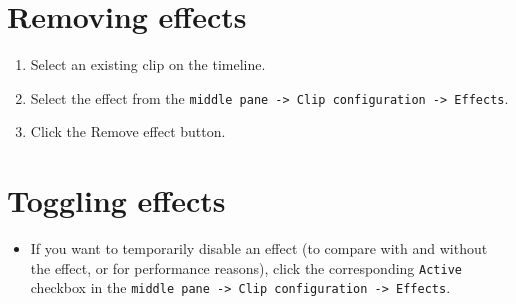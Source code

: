 
\section{Removing effects}

\begin{enumerate}
\item Select an existing clip on the timeline.
\item Select the effect from the
  \verb|middle pane -> Clip configuration -> Effects|.
\item Click the Remove effect button.
\end{enumerate}


\section{Toggling effects}

\begin{itemize}
\item If you want to temporarily disable an effect (to compare with
  and without the effect, or for performance reasons), click the
  corresponding \verb|Active| checkbox in the
  \verb|middle pane -> Clip configuration -> Effects|.
\end{itemize}


